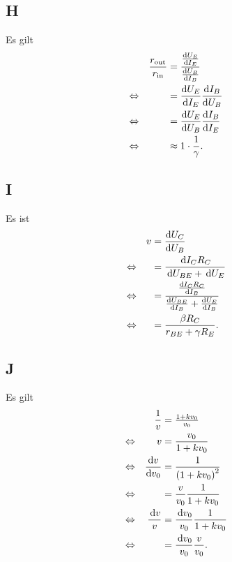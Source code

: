 \documentclass[a4paper,10pt]{article}
\newcommand{\td}{\,\text{d}}
\numberwithin{equation}{section}
\begin{document}
\begin{multicols}{2}
        \subsection{H}
        Es gilt
        \begin{align} 
                && \dfrac{r_\text{out}}{r_\text{in}} &= \dfrac{\diff[]{U_E}{I_E}}{\diff[]{U_B}{I_B}} &&\\
                \Leftrightarrow && &= \diff[]{U_E}{I_E}\diff[]{I_B}{U_B} &&\nonumber \\
                \Leftrightarrow && &= \diff[]{U_E}{U_B}\diff[]{I_B}{I_E} &&\nonumber \\
                \Leftrightarrow && &\approx 1\cdot \dfrac{1}{\gamma }. &&
        \end{align} 

        \subsection{I}
        Es ist
        \begin{align} 
                && v &= \diff[]{U_C}{U_B} &&\\
                \Leftrightarrow && &= \dfrac{\td I_CR_C}{\td U_{BE}+\td U_E} &&\nonumber \\
                \Leftrightarrow && &= \dfrac{\diff[]{I_CR_C}{I_B}}{\diff[]{U_{BE}}{I_B}+\diff[]{U_E}{I_B}} &&\nonumber \\
                \Leftrightarrow && &= \dfrac{\beta R_C}{r_{BE}+\gamma R_E}. &&
        \end{align} 

        \subsection{J}
        Es gilt
        \begin{align} 
                && \dfrac{1}{v} &= \tfrac{1+kv_0}{v_0} && \\
                \Leftrightarrow && v &= \dfrac{v_0}{1+kv_0} &&\nonumber \\
                \Leftrightarrow && \diff[]{v}{v_0} &= \dfrac{1}{\left(1+kv_0\right)^2} &&\nonumber \\
                \Leftrightarrow && &= \dfrac{v}{v_0}\dfrac{1}{1+kv_0} &&\nonumber \\
                \Leftrightarrow && \dfrac{\td v}{v} &= \dfrac{\td v_0}{v_0}\dfrac{1}{1+kv_0}&&\nonumber \\
                \Leftrightarrow && &= \dfrac{\td v_0}{v_0}\dfrac{v}{v_0}. &&
        \end{align} 


\end{multicols}
\end{document}
